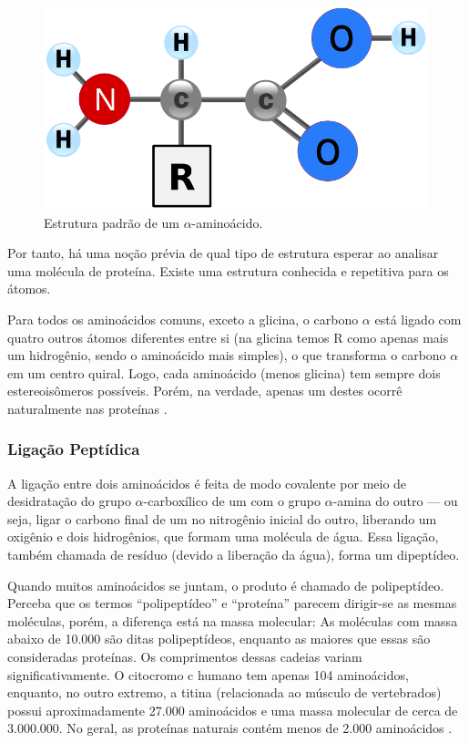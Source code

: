 \documentclass[a4paper,12pt]{article}
\begin{document}
	\begin{figure}[H]
		\begin{center}
			\includegraphics[width=0.35\linewidth]{amino.png}
		\end{center}
		\caption{Estrutura padrão de um $\alpha$-aminoácido.}
		\label{fig:amino}
	\end{figure}
	
	Por tanto, há uma noção prévia de qual tipo de estrutura esperar ao analisar uma molécula de proteína. Existe uma estrutura conhecida e repetitiva para os átomos.
	
	Para todos os aminoácidos comuns, exceto a glicina, o carbono $\alpha$ está ligado com quatro outros átomos diferentes entre si (na glicina temos R como apenas mais um hidrogênio, sendo o aminoácido mais simples), o que transforma o carbono $\alpha$ em um centro quiral. Logo, cada aminoácido (menos glicina) tem sempre dois estereoisômeros possíveis. Porém, na verdade, apenas um destes ocorrê naturalmente nas proteínas \cite{bioquimicaLehninger}.
	
	\subsubsection*{Ligação Peptídica}
	A ligação entre dois aminoácidos é feita de modo covalente por meio de desidratação do grupo $\alpha$-carboxílico de um com o grupo $\alpha$-amina do outro --- ou seja, ligar o carbono final de um no nitrogênio inicial do outro, liberando um oxigênio e dois hidrogênios, que formam uma molécula de água. Essa ligação, também chamada de resíduo (devido a liberação da água), forma um dipeptídeo. 
	
	Quando muitos aminoácidos se juntam, o produto é chamado de polipeptídeo. Perceba que os termos ``polipeptídeo'' e ``proteína'' parecem dirigir-se as mesmas moléculas, porém, a diferença está na massa molecular: As moléculas com massa abaixo de 10.000 são ditas polipeptídeos, enquanto as maiores que essas são consideradas proteínas. Os comprimentos dessas cadeias variam significativamente. O citocromo c humano tem apenas 104 aminoácidos, enquanto, no outro extremo, a titina (relacionada ao músculo de vertebrados) possui aproximadamente 27.000 aminoácidos e uma massa molecular de cerca de 3.000.000. No geral, as proteínas naturais contém menos de 2.000 aminoácidos \cite{bioquimicaLehninger}.
	
\end{document}

